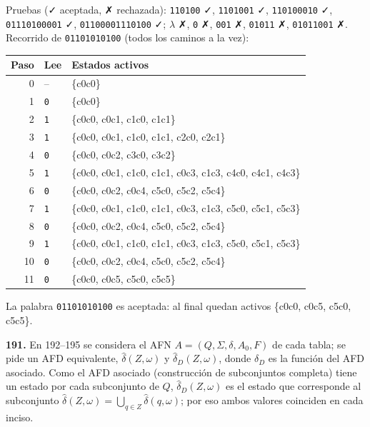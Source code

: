 \documentclass[11pt]{article}
\begin{document}
Pruebas (✓ aceptada, ✗ rechazada): \texttt{110100} ✓, \texttt{1101001} ✓, \texttt{110100010} ✓, \texttt{01110100001} ✓, \texttt{01100001110100} ✓; $\lambda$ ✗, \texttt{0} ✗, \texttt{001} ✗, \texttt{01011} ✗, \texttt{01011001} ✗.
Recorrido de \texttt{01101010100} (todos los caminos a la vez):
\begin{center}\footnotesize\begin{tabular}{rll}\toprule Paso & Lee & Estados activos \\\midrule
0 & -- & \{c0c0\} \\
1 & \texttt{0} & \{c0c0\} \\
2 & \texttt{1} & \{c0c0, c0c1, c1c0, c1c1\} \\
3 & \texttt{1} & \{c0c0, c0c1, c1c0, c1c1, c2c0, c2c1\} \\
4 & \texttt{0} & \{c0c0, c0c2, c3c0, c3c2\} \\
5 & \texttt{1} & \{c0c0, c0c1, c1c0, c1c1, c0c3, c1c3, c4c0, c4c1, c4c3\} \\
6 & \texttt{0} & \{c0c0, c0c2, c0c4, c5c0, c5c2, c5c4\} \\
7 & \texttt{1} & \{c0c0, c0c1, c1c0, c1c1, c0c3, c1c3, c5c0, c5c1, c5c3\} \\
8 & \texttt{0} & \{c0c0, c0c2, c0c4, c5c0, c5c2, c5c4\} \\
9 & \texttt{1} & \{c0c0, c0c1, c1c0, c1c1, c0c3, c1c3, c5c0, c5c1, c5c3\} \\
10 & \texttt{0} & \{c0c0, c0c2, c0c4, c5c0, c5c2, c5c4\} \\
11 & \texttt{0} & \{c0c0, c0c5, c5c0, c5c5\} \\
\bottomrule\end{tabular}\end{center}

\resp La palabra \texttt{01101010100} es aceptada: al final quedan activos \{c0c0, c0c5, c5c0, c5c5\}.


\textbf{191.} En 192--195 se considera el AFN $A = (Q, \Sigma, \delta, A_0, F)$ de cada tabla; se pide un AFD equivalente, $\hat\delta(Z, \omega)$ y $\hat\delta_D(Z, \omega)$, donde $\delta_D$ es la función del AFD asociado. Como el AFD asociado (construcción de subconjuntos completa) tiene un estado por cada subconjunto de $Q$, $\hat\delta_D(Z, \omega)$ es el estado que corresponde al subconjunto $\hat\delta(Z, \omega) = \bigcup_{q \in Z}\hat\delta(q, \omega)$; por eso ambos valores coinciden en cada inciso.
\end{document}
